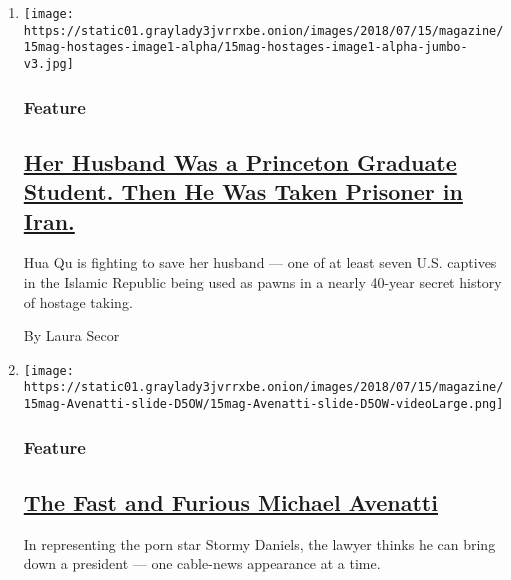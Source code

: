 \begin{enumerate}
\def\labelenumi{\arabic{enumi}.}
\item
  \texttt{[image: https://static01.graylady3jvrrxbe.onion/images/2018/07/15/magazine/15mag-hostages-image1-alpha/15mag-hostages-image1-alpha-jumbo-v3.jpg]}

  \hypertarget{feature}{%
  \subsubsection{Feature}\label{feature}}

  \hypertarget{her-husband-was-a-princeton-graduate-student-then-he-was-taken-prisoner-in-iran}{%
  \subsection{\texorpdfstring{\href{/2018/07/10/magazine/american-civilian-hostages-in-iran.html}{Her
  Husband Was a Princeton Graduate Student. Then He Was Taken Prisoner
  in
  Iran.}}{Her Husband Was a Princeton Graduate Student. Then He Was Taken Prisoner in Iran.}}\label{her-husband-was-a-princeton-graduate-student-then-he-was-taken-prisoner-in-iran}}

  Hua Qu is fighting to save her husband --- one of at least seven U.S.
  captives in the Islamic Republic being used as pawns in a nearly
  40-year secret history of hostage taking.

  By Laura Secor
\item
  \texttt{[image: https://static01.graylady3jvrrxbe.onion/images/2018/07/15/magazine/15mag-Avenatti-slide-D5OW/15mag-Avenatti-slide-D5OW-videoLarge.png]}

  \hypertarget{feature-1}{%
  \subsubsection{Feature}\label{feature-1}}

  \hypertarget{the-fast-and-furious-michael-avenatti}{%
  \subsection{\texorpdfstring{\href{/2018/07/10/magazine/michael-avenatti-stormy-daniels-donald-trump-media.html}{The
  Fast and Furious Michael
  Avenatti}}{The Fast and Furious Michael Avenatti}}\label{the-fast-and-furious-michael-avenatti}}

  In representing the porn star Stormy Daniels, the lawyer thinks he can
  bring down a president --- one cable-news appearance at a time.


\end{enumerate}
